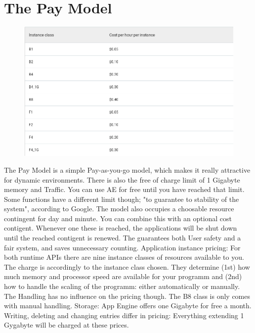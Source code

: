 \documentclass{article}
\begin{document}
\section{The Pay Model}
\begin{figure}
	\centering
	\includegraphics[width=0.7\linewidth]{"Screenshot from 2019-11-30 17-46-06"}
	\caption{}
	\label{fig:screenshot-from-2019-11-30-17-46-06}
\end{figure}
The Pay Model is a simple Pay-as-you-go model, which makes it really attractive for dynamic environments. There is also the free of charge limit of 1 Gigabyte memory and Traffic. You can use AE for free until you have reached that limit. Some functions have a different limit though; "to guarantee to stability of the system", according to Google. 
The model also occupies a choosable resource contingent for day and minute. You can combine this with an optional cost contigent. Whenever one these is reached, the applications will be shut down until the reached contigent is renewed. The guarantees both User safety and a fair system, and saves unnecessary counting.
Application instance pricing:
For both runtime APIs there are nine instance classes of resources available to you. The charge is accordingly to the instance class chosen.
They determine  (1st) how much memory and processor speed are available for your programm and (2nd) how to handle the scaling of the programm: either automatically or manually. 
The Handling has no influence on the pricing though. 
The B8 class is only comes with manual handling.
Storage: App Engine offers one Gigabyte for free a month. Writing, deleting and changing entries differ in pricing: 
Everything extending 1 Gygabyte will be charged at these prices.  
\\
\end{document}
